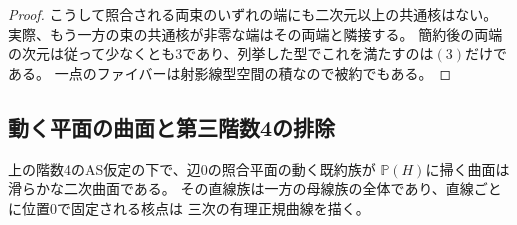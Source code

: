 \begin{proof}
こうして照合される両束のいずれの端にも二次元以上の共通核はない。
実際、もう一方の束の共通核が非零な端はその両端と隣接する。
簡約後の両端の次元は従って少なくとも3であり、列挙した型でこれを満たすのは$(3)$だけである。
一点のファイバーは射影線型空間の積なので被約でもある。
\end{proof}

\subsection{動く平面の曲面と第三階数4の排除}
\begin{lemma}[動く照合直線が掃く曲面]\label{lem:matched-ruling-quadric}
上の階数4のAS仮定の下で、辺0の照合平面の動く既約族が
$\mathbb P(H)$に掃く曲面は滑らかな二次曲面である。
その直線族は一方の母線族の全体であり、直線ごとに位置0で固定される核点は
三次の有理正規曲線を描く。
\end{lemma}
